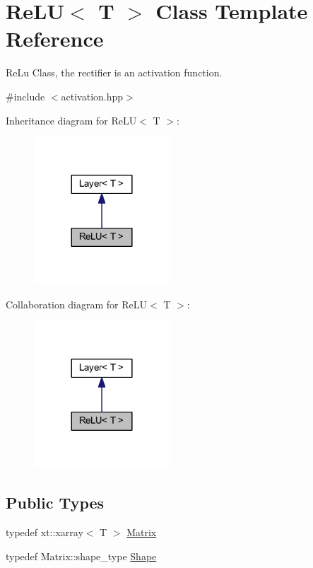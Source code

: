 \hypertarget{class_re_l_u}{}\section{Re\+LU$<$ T $>$ Class Template Reference}
\label{class_re_l_u}


Re\+Lu Class, the rectifier is an activation function.  




{\ttfamily \#include $<$activation.\+hpp$>$}



Inheritance diagram for Re\+LU$<$ T $>$\+:\nopagebreak
\begin{figure}[H]
\begin{center}
\leavevmode
\includegraphics[width=144pt]{class_re_l_u__inherit__graph}
\end{center}
\end{figure}


Collaboration diagram for Re\+LU$<$ T $>$\+:\nopagebreak
\begin{figure}[H]
\begin{center}
\leavevmode
\includegraphics[width=144pt]{class_re_l_u__coll__graph}
\end{center}
\end{figure}
\subsection*{Public Types}
\begin{DoxyCompactItemize}
\item 
typedef xt\+::xarray$<$ T $>$ \mbox{\hyperlink{class_re_l_u_a3d1448f06335a4ab7227ec31a43a410f}{Matrix}}
\item 
typedef Matrix\+::shape\+\_\+type \mbox{\hyperlink{class_re_l_u_ae27e6aba0a09baa85b8ef8679db42719}{Shape}}
\end{DoxyCompactItemize}
